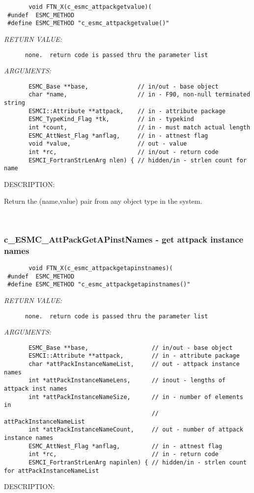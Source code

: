   
\begin{verbatim}       void FTN_X(c_esmc_attpackgetvalue)(
 #undef  ESMC_METHOD
 #define ESMC_METHOD "c_esmc_attpackgetvalue()"\end{verbatim}{\em RETURN VALUE:}
\begin{verbatim}      none.  return code is passed thru the parameter list
   \end{verbatim}{\em ARGUMENTS:}
\begin{verbatim}       ESMC_Base **base,              // in/out - base object
       char *name,                    // in - F90, non-null terminated string
       ESMCI::Attribute **attpack,    // in - attribute package
       ESMC_TypeKind_Flag *tk,        // in - typekind
       int *count,                    // in - must match actual length
       ESMC_AttNest_Flag *anflag,     // in - attnest flag
       void *value,                   // out - value
       int *rc,                       // in/out - return code
       ESMCI_FortranStrLenArg nlen) { // hidden/in - strlen count for name
   \end{verbatim}
{\sf DESCRIPTION:\\ }


       Return the (name,value) pair from any object type in the system.
   
 
\mbox{}\hrulefill\ 
 
\subsubsection [c\_ESMC\_AttPackGetAPinstNames] {c\_ESMC\_AttPackGetAPinstNames - get attpack instance names}


  
\begin{verbatim}       void FTN_X(c_esmc_attpackgetapinstnames)(
 #undef  ESMC_METHOD
 #define ESMC_METHOD "c_esmc_attpackgetapinstnames()"\end{verbatim}{\em RETURN VALUE:}
\begin{verbatim}      none.  return code is passed thru the parameter list
   \end{verbatim}{\em ARGUMENTS:}
\begin{verbatim}       ESMC_Base **base,                  // in/out - base object
       ESMCI::Attribute **attpack,        // in - attribute package
       char *attPackInstanceNameList,     // out - attpack instance names
       int *attPackInstanceNameLens,      // inout - lengths of attpack inst names
       int *attPackInstanceNameSize,      // in - number of elements in 
                                          //      attPackInstanceNameList
       int *attPackInstanceNameCount,     // out - number of attpack instance names
       ESMC_AttNest_Flag *anflag,         // in - attnest flag
       int *rc,                           // in - return code
       ESMCI_FortranStrLenArg napinlen) { // hidden/in - strlen count for attPackInstanceNameList
   \end{verbatim}
{\sf DESCRIPTION:\\ }


